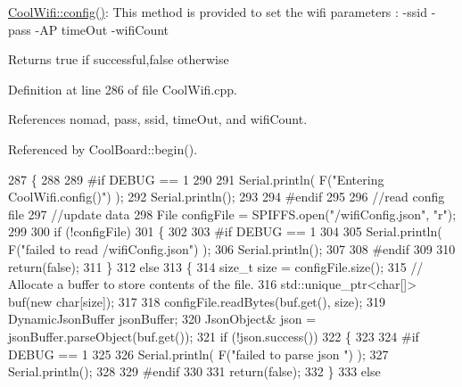 \hyperlink{classCoolWifi_a4eb2f6b9b09dd588964b88b6c70122c0}{Cool\+Wifi\+::config()}\+: This method is provided to set the wifi parameters \+: -\/ssid -\/pass -\/\+AP time\+Out -\/wifi\+Count

\begin{DoxyReturn}{Returns}
true if successful,false otherwise 
\end{DoxyReturn}


Definition at line 286 of file Cool\+Wifi.\+cpp.



References nomad, pass, ssid, time\+Out, and wifi\+Count.



Referenced by Cool\+Board\+::begin().


\begin{DoxyCode}
287 \{
288 
289 \textcolor{preprocessor}{#if DEBUG == 1 }
290 
291     Serial.println( F(\textcolor{stringliteral}{"Entering CoolWifi.config()"}) );
292     Serial.println();
293 
294 \textcolor{preprocessor}{#endif}
295 
296     \textcolor{comment}{//read config file}
297     \textcolor{comment}{//update data}
298     File configFile = SPIFFS.open(\textcolor{stringliteral}{"/wifiConfig.json"}, \textcolor{stringliteral}{"r"});
299 
300     \textcolor{keywordflow}{if} (!configFile) 
301     \{
302     
303 \textcolor{preprocessor}{    #if DEBUG == 1 }
304 
305         Serial.println( F(\textcolor{stringliteral}{"failed to read /wifiConfig.json"}) );
306         Serial.println();
307 
308 \textcolor{preprocessor}{    #endif}
309 
310         \textcolor{keywordflow}{return}(\textcolor{keyword}{false});
311     \}
312     \textcolor{keywordflow}{else}
313     \{
314         \textcolor{keywordtype}{size\_t} size = configFile.size();
315         \textcolor{comment}{// Allocate a buffer to store contents of the file.}
316         std::unique\_ptr<char[]> buf(\textcolor{keyword}{new} \textcolor{keywordtype}{char}[size]);
317 
318         configFile.readBytes(buf.get(), size);
319         DynamicJsonBuffer jsonBuffer;
320         JsonObject& json = jsonBuffer.parseObject(buf.get());
321         \textcolor{keywordflow}{if} (!json.success()) 
322         \{
323         
324 \textcolor{preprocessor}{        #if DEBUG == 1 }
325 
326             Serial.println( F(\textcolor{stringliteral}{"failed to parse json "}) );
327             Serial.println();
328         
329 \textcolor{preprocessor}{        #endif}
330             
331             \textcolor{keywordflow}{return}(\textcolor{keyword}{false});
332         \} 
333         \textcolor{keywordflow}{else}

\end{DoxyCode}
